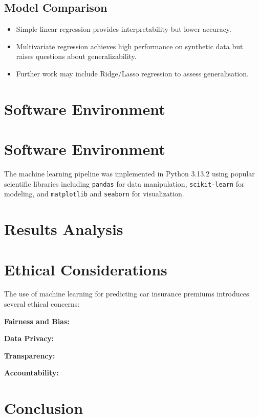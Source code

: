 \documentclass{article}
\begin{document}
\subsection{Model Comparison}

\begin{itemize}
\item Simple linear regression provides interpretability but lower accuracy.
\item Multivariate regression achieves high performance on synthetic data but raises questions about generalizability.
\item Further work may include Ridge/Lasso regression to assess generalisation.
\end{itemize}

\newpage
\section{Software Environment}


\section{Software Environment}

The machine learning pipeline was implemented in Python 3.13.2 using popular scientific libraries including \texttt{pandas} for data manipulation, \texttt{scikit-learn} for modeling, and \texttt{matplotlib} and \texttt{seaborn} for visualization.



\newpage
\section{Results Analysis}

\newpage
\section{Ethical Considerations}

The use of machine learning for predicting car insurance premiums introduces several ethical concerns:

\textbf{Fairness and Bias:} 

\textbf{Data Privacy:} 

\textbf{Transparency:} 

\textbf{Accountability:} 

\newpage
\section{Conclusion}

\newpage
\printbibliography
\end{document}
